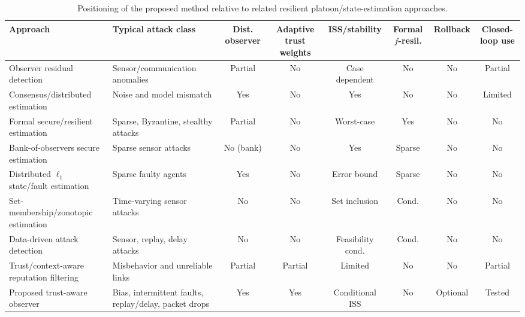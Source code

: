 \documentclass[letterpaper,journal]{IEEEtran}
\begin{document}
\begin{table}[!b]
\centering
\caption{Positioning of the proposed method relative to related resilient platoon/state-estimation approaches.}
\label{tab:related_comparison}
\scriptsize
\setlength{\tabcolsep}{3pt}
\renewcommand{\arraystretch}{0.94}
\begin{tabular}{p{2.45cm}p{2.4cm}cccccc}
\toprule
\textbf{Approach} & \textbf{Typical attack class} & \textbf{Dist. observer} & \textbf{Adaptive trust weights} & \textbf{ISS/stability} & \textbf{Formal $f$-resil.} & \textbf{Rollback} & \textbf{Closed-loop use} \\
\midrule
Observer residual detection~\cite{jeon2020simultaneous,yamamoto2021attack,huang2022detection,2_obs_Angelo} & Sensor/communication anomalies & Partial & No & Case dependent & No & No & Partial \\
Consensus/distributed estimation~\cite{Guitao_multi_mesure,Consensus_discret_Saber,Plug_play} & Noise and model mismatch & Yes & No & Yes & No & No & Limited \\
Formal secure/resilient estimation~\cite{fawzi2014secure,mitra2018byzantine,khazraei2020attack_auth} & Sparse, Byzantine, stealthy attacks & Partial & No & Worst-case & Yes & No & No \\
Bank-of-observers secure estimation~\cite{chong2021secure} & Sparse sensor attacks & No (bank) & No & Yes & Sparse & No & No \\
Distributed $\ell_1$ state/fault estimation~\cite{hashimoto2020distributed_l1} & Sparse faulty agents & Yes & No & Error bound & Sparse & No & No \\
Set-membership/zonotopic estimation~\cite{niazi2023resilient_set} & Time-varying sensor attacks & No & No & Set inclusion & Cond. & No & No \\
Data-driven attack detection~\cite{coimbatore2025data_driven_attack} & Sensor, replay, delay attacks & No & No & Feasibility cond. & Cond. & No & No \\
Trust/context-aware reputation filtering~\cite{trust_physic_connecte,KF_chisquare_meusure,trust_simple,trust_complex,siddiqui2023trust_vehicles,self-belive,Enhancing_control_trust} & Misbehavior and unreliable links & Partial & Partial & Limited & No & No & Partial \\
Proposed trust-aware observer & Bias, intermittent faults, replay/delay, packet drops & Yes & Yes & Conditional ISS & No & Optional & Tested \\
\bottomrule
\end{tabular}
\end{table}
\end{document}
